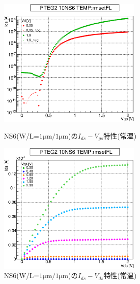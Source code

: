 				\begin{figure}[htbp]
					\begin{minipage}{0.5\hsize}
						\begin{center}
							\includegraphics[width=70mm]{./Chapter/Appendix/Picture/NST/NS6/PTEG2_10_NS6_IdVg_rmsetFL.eps}
						\end{center}
						\caption{NS6(W/L=$1\mathrm{\mu m}/1\mathrm{\mu m}$)の$I_{ds}-V_{gs}$特性(常温)}
						\label{fig:NS6_IdVg_room}
					\end{minipage}
					\begin{minipage}{0.5\hsize}
						\begin{center}
							\includegraphics[width=70mm]{./Chapter/Appendix/Picture/NST/NS6/PTEG2_10_NS6_IdVd_rmsetFL.eps}
						\end{center}
						\caption{NS6(W/L=$1\mathrm{\mu m}/1\mathrm{\mu m}$)の$I_{ds}-V_{ds}$特性(常温)}
						\label{fig:NS6_IdVd_room}
					\end{minipage}
				\end{figure}
